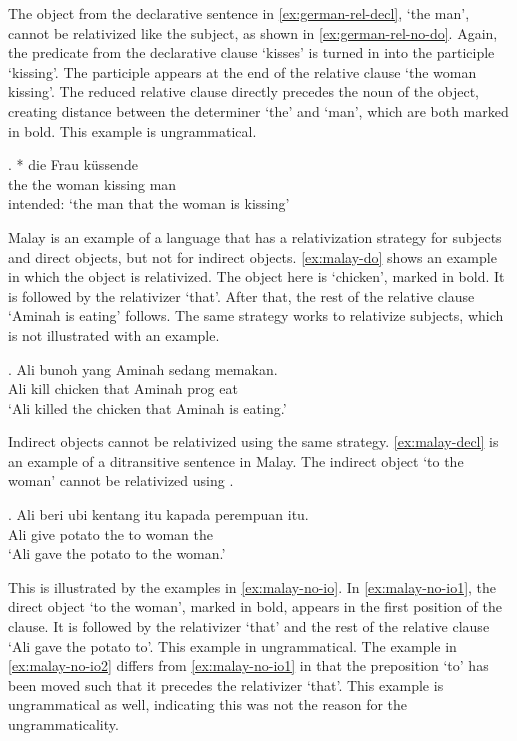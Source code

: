 The object from the declarative sentence in \ref{ex:german-rel-decl},  `the man', cannot be relativized like the subject, as shown in \ref{ex:german-rel-no-do}. Again, the predicate from the declarative clause  `kisses' is turned in into the participle  `kissing'. The participle appears at the end of the relative clause  `the woman kissing'. The reduced relative clause directly precedes the noun of the object, creating distance between the determiner  `the' and  `man', which are both marked in bold. This example is ungrammatical.

\exg. * die Frau küssende \\
 the the woman kissing man\\
 intended: `the man that the woman is kissing' \label{ex:german-rel-no-do}

Malay is an example of a language that has a relativization strategy for subjects and direct objects, but not for indirect objects. \ref{ex:malay-do} shows an example in which the object is relativized. The object here is  `chicken', marked in bold. It is followed by the relativizer  `that'. After that, the rest of the relative clause  `Aminah is eating' follows. The same strategy works to relativize subjects, which is not illustrated with an example.

\exg. Ali bunoh  yang Aminah sedang memakan.\\
 Ali kill chicken that Aminah \ac{prog} eat\\
 `Ali killed the chicken that Aminah is eating.' \label{ex:malay-do}

Indirect objects cannot be relativized using the same strategy. \ref{ex:malay-decl} is an example of a ditransitive sentence in Malay. The indirect object  `to the woman' cannot be relativized using .

\exg. Ali beri {ubi kentang} itu kapada perempuan itu.\\
 Ali give potato the to woman the\\
 `Ali gave the potato to the woman.'\label{ex:malay-decl} 

This is illustrated by the examples in \ref{ex:malay-no-io}. In \ref{ex:malay-no-io1}, the direct object  `to the woman', marked in bold, appears in the first position of the clause. It is followed by the relativizer  `that' and the rest of the relative clause  `Ali gave the potato to'. This example in ungrammatical.
The example in \ref{ex:malay-no-io2} differs from \ref{ex:malay-no-io1} in that the preposition  `to' has been moved such that it precedes the relativizer  `that'. This example is ungrammatical as well, indicating this was not the reason for the ungrammaticality.

